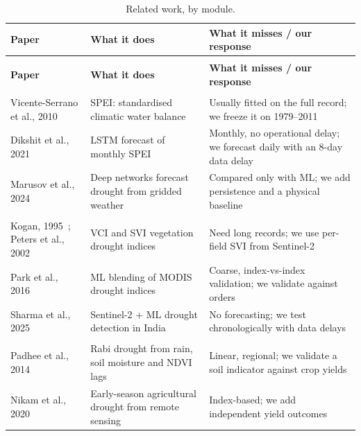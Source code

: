 \documentclass[11pt,a4paper,oneside]{article}
\begin{document}
{\scriptsize
\renewcommand{\arraystretch}{1.05}
\setlength{\LTpre}{6pt}\setlength{\LTpost}{2pt}
\begin{longtable}{@{}>{\raggedright\arraybackslash}p{3.3cm}>{\raggedright\arraybackslash}p{6.05cm}>{\raggedright\arraybackslash}p{6.05cm}@{}}
\caption{Related work, by module.}\label{tab:lit}\\
\toprule
\textbf{Paper} & \textbf{What it does} & \textbf{What it misses / our response} \\
\midrule
\endfirsthead
\multicolumn{3}{@{}l}{\small\textit{Table~\ref{tab:lit} (continued)}} \\
\toprule
\textbf{Paper} & \textbf{What it does} & \textbf{What it misses / our response} \\
\midrule
\endhead
\bottomrule
\endfoot
\bottomrule
\endlastfoot
\multicolumn{3}{@{}l}{\textit{Weather}} \\
\nopagebreak
Vicente-Serrano et al., 2010~\cite{vicente2010} & SPEI: standardised climatic water balance & Usually fitted on the full record; we freeze it on 1979--2011 \\
\nopagebreak
Dikshit et al., 2021~\cite{dikshit2021} & LSTM forecast of monthly SPEI & Monthly, no operational delay; we forecast daily with an 8-day data delay \\
\nopagebreak
Marusov et al., 2024~\cite{marusov2024} & Deep networks forecast drought from gridded weather & Compared only with ML; we add persistence and a physical baseline \\
\multicolumn{3}{@{}l}{\textit{Satellite}} \\
\nopagebreak
Kogan, 1995~\cite{kogan1995}; Peters et al., 2002~\cite{peters2002} & VCI and SVI vegetation drought indices & Need long records; we use per-field SVI from Sentinel-2 \\
\nopagebreak
Park et al., 2016~\cite{park2016} & ML blending of MODIS drought indices & Coarse, index-vs-index validation; we validate against orders \\
\nopagebreak
Sharma et al., 2025~\cite{sharma2025} & Sentinel-2 + ML drought detection in India & No forecasting; we test chronologically with data delays \\
\multicolumn{3}{@{}l}{\textit{Rabi}} \\
\nopagebreak
Padhee et al., 2014~\cite{padhee2014} & Rabi drought from rain, soil moisture and NDVI lags & Linear, regional; we validate a soil indicator against crop yields \\
\nopagebreak
Nikam et al., 2020~\cite{nikam2020} & Early-season agricultural drought from remote sensing & Index-based; we add independent yield outcomes \\

\end{longtable}}
\end{document}
